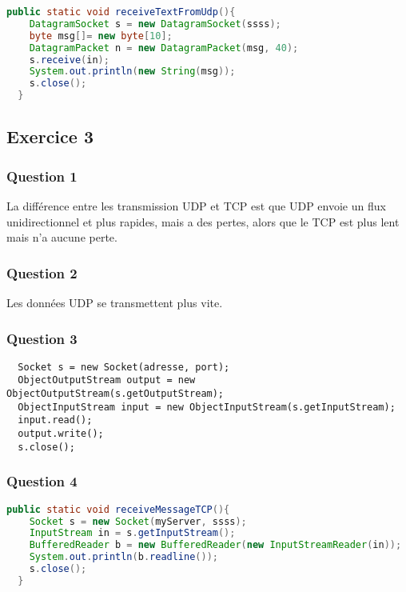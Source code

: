 \begin{lstlisting}[language=Java]
  public static void receiveTextFromUdp(){
    DatagramSocket s = new DatagramSocket(ssss);
    byte msg[]= new byte[10];
    DatagramPacket n = new DatagramPacket(msg, 40);
    s.receive(in);
    System.out.println(new String(msg));
    s.close();
  }
\end{lstlisting}

\subsection{Exercice 3}

\subsubsection{Question 1}

La différence entre les transmission UDP et TCP est que UDP envoie un flux unidirectionnel et plus rapides, mais a des pertes,
alors que le TCP est plus lent mais n'a aucune perte.

\subsubsection{Question 2}

Les données UDP se transmettent plus vite.

\subsubsection{Question 3}

\begin{lstlisting}
  Socket s = new Socket(adresse, port);
  ObjectOutputStream output = new ObjectOutputStream(s.getOutputStream);
  ObjectInputStream input = new ObjectInputStream(s.getInputStream);
  input.read();
  output.write();
  s.close();
\end{lstlisting}

\subsubsection{Question 4}

\begin{lstlisting}[language=Java]
  public static void receiveMessageTCP(){
    Socket s = new Socket(myServer, ssss);
    InputStream in = s.getInputStream();
    BufferedReader b = new BufferedReader(new InputStreamReader(in));
    System.out.println(b.readline());
    s.close();
  }
\end{lstlisting}
